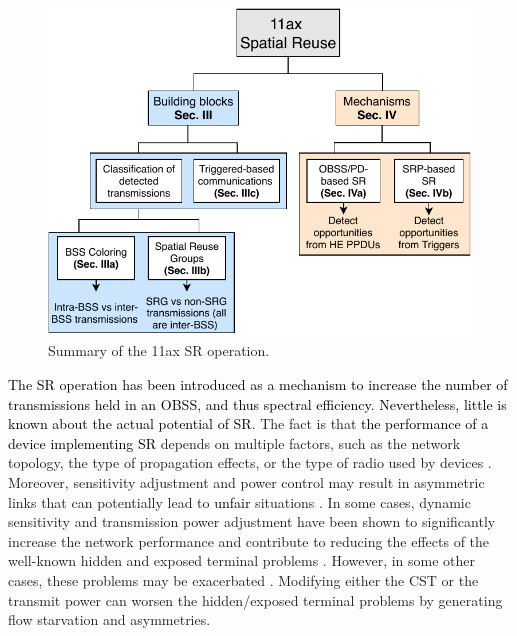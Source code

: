 \documentclass[preprint,12pt]{elsarticle}
\theoremstyle{plain}
\begin{document}
\begin{figure}[ht!]
	\centering
	\includegraphics[width=.6\columnwidth]{sr_summary}
	\caption{Summary of the 11ax SR operation.}
	\label{fig:sr_summary}
\end{figure}

\textcolor{black}{The SR operation has been introduced as a mechanism to increase the number of transmissions held in an OBSS, and thus spectral efficiency. Nevertheless, little is known about the actual potential of SR.} The fact is that \textcolor{black}{the performance of a device implementing SR} depends on multiple factors, such as the network topology, the type of propagation effects, or the type of radio used by devices \cite{guo2003spatial, zhu2004adapting}. Moreover, sensitivity adjustment and power control may result in asymmetric links that can potentially lead to \textcolor{black}{unfair} situations \cite{mhatre2007interference}. In some cases, dynamic sensitivity and transmission power adjustment have been shown to significantly increase the network performance and contribute to reducing the effects of the well-known hidden and exposed terminal problems \cite{zhou2005balancing}. However, in some other cases, these problems may be exacerbated \cite{wilhelmi2019potential}. Modifying either the CST or the transmit power can worsen the hidden/exposed terminal problems by generating flow starvation and asymmetries.
\end{document}
